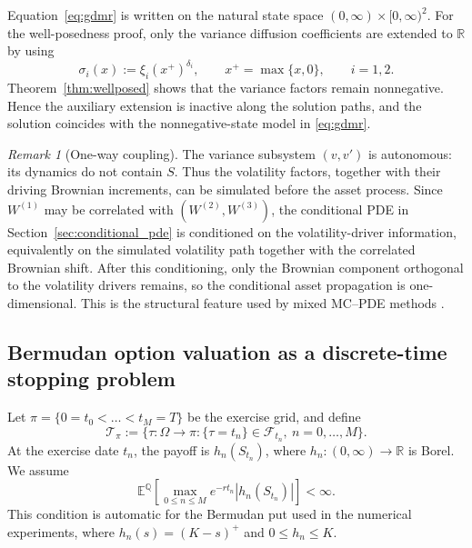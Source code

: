 \documentclass[10pt]{article}
\theoremstyle{plain}
\theoremstyle{definition}
\theoremstyle{remark}
\newtheorem{remark}[theorem]{Remark}
\newcommand{\E}{\mathbb E}
\newcommand{\Q}{\mathbb Q}
\newcommand{\R}{\mathbb R}
\begin{document}
Equation~\eqref{eq:gdmr} is written on the natural state space $(0,\infty)\times[0,\infty)^2$. For the well-posedness proof, only the variance diffusion coefficients are extended to $\R$ by using
\[
\sigma_i(x):=\xi_i(x^+)^{\delta_i},\qquad x^+=\max\{x,0\},\qquad i=1,2.
\]
Theorem~\ref{thm:wellposed} shows that the variance factors remain nonnegative. Hence the auxiliary extension is inactive along the solution paths, and the solution coincides with the nonnegative-state model in \eqref{eq:gdmr}.

\begin{remark}[One-way coupling]\label{rem:one-way}
The variance subsystem $(v,v')$ is autonomous: its dynamics do not contain $S$. Thus the volatility factors, together with their driving Brownian increments, can be simulated before the asset process. Since $W^{(1)}$ may be correlated with $(W^{(2)},W^{(3)})$, the conditional PDE in Section~\ref{sec:conditional_pde} is conditioned on the volatility-driver information, equivalently on the simulated volatility path together with the correlated Brownian shift. After this conditioning, only the Brownian component orthogonal to the volatility drivers remains, so the conditional asset propagation is one-dimensional. This is the structural feature used by mixed MC--PDE methods \citep{farahany2020mixing}.
\end{remark}

\subsection{Bermudan option valuation as a discrete-time stopping problem}

Let $\pi=\{0=t_0<\dots<t_M=T\}$ be the exercise grid, and define
\[
\mathcal T_\pi:=
\{\tau:\Omega\to\pi:\{\tau=t_n\}\in\mathcal F_{t_n},\ n=0,\dots,M\}.
\]
At the exercise date $t_n$, the payoff is $h_n(S_{t_n})$, where $h_n:(0,\infty)\to\R$ is Borel. We assume
\[
\E^\Q\!\left[\max_{0\le n\le M} e^{-rt_n}|h_n(S_{t_n})|\right]<\infty.
\]
This condition is automatic for the Bermudan put used in the numerical experiments, where $h_n(s)=(K-s)^+$ and $0\le h_n\le K$.
\end{document}
